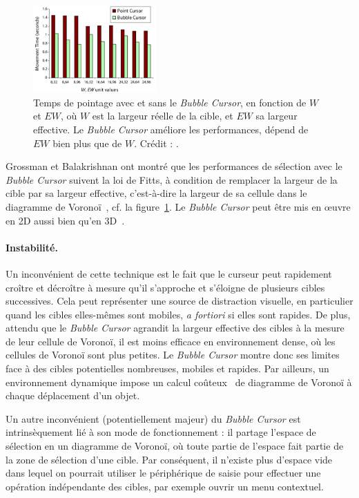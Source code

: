 	\begin{figure}
		\centering
		\includegraphics[width=0.42\textwidth]{figures/ch2/bubbleResults}
		\caption[\emph{Bubble Cursor} --  performances]{Temps de pointage avec et sans le \emph{Bubble Cursor}, en fonction de $W$ et $EW$, où $W$ est la largeur réelle de la cible, et $EW$ sa largeur effective. Le \emph{Bubble Cursor} améliore les performances, dépend de $EW$ bien plus que de $W$. Crédit : \cite{grossman2005bubble}.}
		\label{fig:bubbleResults}
	\end{figure}
	
	Grossman et Balakrishnan ont montré que les performances de sélection avec le \emph{Bubble Cursor} suivent la loi de Fitts, à condition de remplacer la largeur de la cible par sa largeur effective, c'est-à-dire la largeur de sa cellule dans le diagramme de Voronoï~\cite{grossman2005bubble}, cf. la figure~\ref{fig:bubbleResults}. Le \emph{Bubble Cursor} peut être mis en œuvre en 2D aussi bien qu'en 3D~\cite{vanacken2007exploring}.

	\paragraph{Instabilité.}
	Un inconvénient de cette technique est le fait que le curseur peut rapidement croître et décroître à mesure qu'il s'approche et s'éloigne de plusieurs cibles successives. Cela peut représenter une source de distraction visuelle, en particulier quand les cibles elles-mêmes sont mobiles, \emph{a fortiori} si elles sont rapides. De plus, attendu que le \emph{Bubble Cursor} agrandit la largeur effective des cibles à la mesure de leur cellule de Voronoï, il est moins efficace en environnement dense, où les cellules de Voronoï sont plus petites. Le \emph{Bubble Cursor} montre donc ses limites face à des cibles potentielles nombreuses, mobiles et rapides. Par ailleurs, un environnement dynamique impose un calcul coûteux~\cite{aurenhammer2000voronoi} de diagramme de Voronoï à chaque déplacement d'un objet.
	
	Un autre inconvénient (potentiellement majeur) du \emph{Bubble Cursor} est intrinsèquement lié à son mode de fonctionnement : il partage l'espace de sélection en un diagramme de Voronoï, où toute partie de l'espace fait partie de la zone de sélection d'une cible. Par conséquent, il n'existe plus d'espace \og vide \fg{} dans lequel on pourrait utiliser le périphérique de saisie pour effectuer une opération indépendante des cibles, par exemple ouvrir un menu contextuel.

